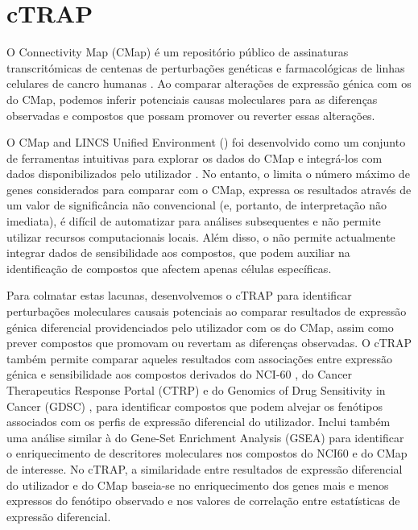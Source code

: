 \section*{cTRAP}

O Connectivity Map (CMap) é um repositório público de assinaturas transcritómicas de centenas de perturbações genéticas e farmacológicas de linhas celulares de cancro humanas \cite{subramanian:2017ul}. Ao comparar alterações de expressão génica com os do CMap, podemos inferir potenciais causas moleculares para as diferenças observadas e compostos que possam promover ou reverter essas alterações.

O CMap and LINCS Unified Environment () foi desenvolvido como um conjunto de ferramentas intuitivas para explorar os dados do CMap e integrá-los com dados disponibilizados pelo utilizador \cite{subramanian:2017ul}. No entanto, o  limita o número máximo de genes considerados para comparar com o CMap, expressa os resultados através de um valor de significância não convencional (e, portanto, de interpretação não imediata), é difícil de automatizar para análises subsequentes e não permite utilizar recursos computacionais locais. Além disso, o  não permite actualmente integrar dados de sensibilidade aos compostos, que podem auxiliar na identificação de compostos que afectem apenas células específicas.

Para colmatar estas lacunas, desenvolvemos o cTRAP para identificar perturbações moleculares causais potenciais ao comparar resultados de expressão génica diferencial providenciados pelo utilizador com os do CMap, assim como prever compostos que promovam ou revertam as diferenças observadas. O cTRAP também permite comparar aqueles resultados com associações entre expressão génica e sensibilidade aos compostos derivados do NCI-60 \cite{shoemaker:2006wi}, do Cancer Therapeutics Response Portal (CTRP) \cite{seashore-ludlow:2015ws} e do Genomics of Drug Sensitivity in Cancer (GDSC) \cite{yang:2012vk}, para identificar compostos que podem alvejar os fenótipos associados com os perfis de expressão diferencial do utilizador. Inclui também uma análise similar à do Gene-Set Enrichment Analysis (GSEA) \cite{subramanian:2005wu} para identificar o enriquecimento de descritores moleculares nos compostos do NCI60 e do CMap de interesse. No cTRAP, a similaridade entre resultados de expressão diferencial do utilizador e do CMap baseia-se no enriquecimento dos genes mais e menos expressos do fenótipo observado \cite{subramanian:2017ul,subramanian:2005wu} e nos valores de correlação entre estatísticas de expressão diferencial.

